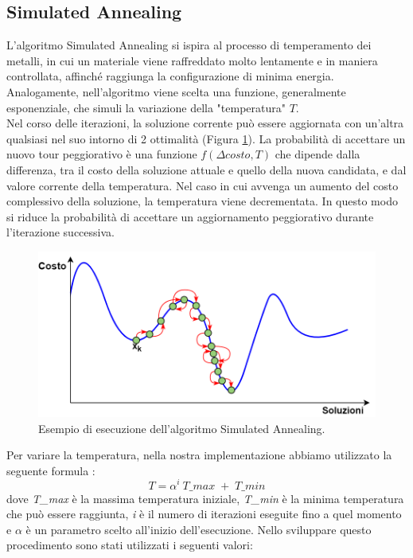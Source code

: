 \subsection{Simulated Annealing}
L'algoritmo Simulated Annealing si ispira al processo di temperamento dei metalli, in cui un materiale viene raffreddato molto lentamente e in maniera controllata, affinché raggiunga la configurazione di minima energia\cite{SA}. Analogamente, nell'algoritmo viene scelta una funzione, generalmente esponenziale, che simuli la variazione della "temperatura" $T$.\\
Nel corso delle iterazioni, la soluzione corrente può essere aggiornata con un'altra qualsiasi nel suo intorno di 2 ottimalità (Figura \ref{simulated_annealing}). La probabilità di accettare un nuovo tour peggiorativo è una funzione $f(\Delta costo, T)$ che dipende dalla differenza, tra il costo della soluzione attuale e quello della nuova candidata, e dal valore corrente della temperatura. Nel caso in cui avvenga un aumento del costo complessivo della soluzione, la temperatura viene decrementata. In questo modo si riduce la probabilità di accettare un aggiornamento peggiorativo durante l'iterazione successiva. \\
 \begin{figure}[H]
\begin{center} 
  \includegraphics[scale=0.38]{Images/simulated_anneling}
  \caption{\footnotesize{Esempio di esecuzione dell'algoritmo Simulated Annealing.}}
  \label{simulated_annealing}
\end{center}
\end{figure}
Per variare la temperatura, nella nostra implementazione abbiamo utilizzato la seguente formula \cite{SA}:
$$T = \alpha^{i}\:T\_max \;+\; T\_min$$
dove \textit{T\_max} è la massima temperatura iniziale, \textit{T\_min} è la minima temperatura che può essere raggiunta, \textit{i} è il numero di iterazioni eseguite fino a quel momento e \textit{$\alpha$} è un parametro scelto all'inizio dell'esecuzione. Nello sviluppare questo procedimento sono stati utilizzati i seguenti valori:
